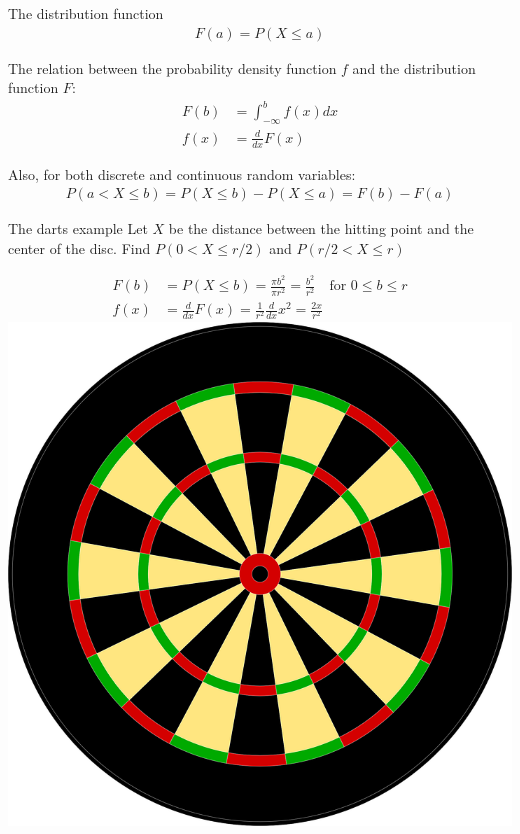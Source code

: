\documentclass{beamer}
\begin{document}
\begin{frame}{The distribution function}
  \begin{align*}
    F(a) = P(X \leq a)
  \end{align*}

  The relation between the probability density function $f$ and the distribution
  function $F$:
  \begin{align*}
    F(b) &= \int_{-\infty}^b f(x)dx\\
    f(x) &= \frac{d}{dx}F(x)
  \end{align*}

  Also, for both discrete and continuous random variables:
  \begin{align*}
    P(a < X \leq b) = P(X \leq b) - P(X \leq a) = F (b) - F (a)
  \end{align*}
\end{frame}

\begin{frame}[t]{The darts example}
  Let $X$ be the distance between the hitting point and the center of the
  disc. Find $P(0<X\leq r/2)$ and $P(r/2<X\leq r)$

  \begin{align*}
    F(b) &= P(X \leq b) = \frac{\pi b^2}{\pi r^2} = \frac{b^2}{r^2}\quad
           \text{for }0\leq b \leq r\\
    f(x) &= \frac{d}{dx}F(x) = \frac{1}{r^2}\frac{d}{dx}x^2=\frac{2x}{r^2}
  \end{align*}
  \includegraphics[width=0.3\linewidth]{darts}
\end{frame}
\end{document}
